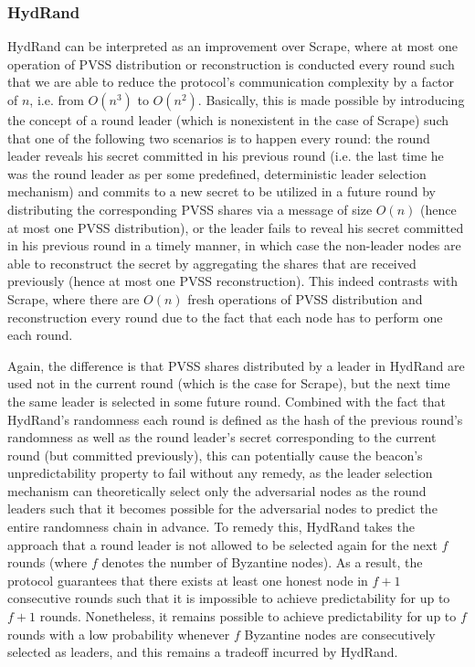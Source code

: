 \documentclass[11pt]{article}
\theoremstyle{definition}
\theoremstyle{remark}
\begin{document}
\subsubsection{HydRand}
HydRand can be interpreted as an improvement over Scrape, where at most one operation of PVSS distribution or reconstruction is conducted every round such that we are able to reduce the protocol's communication complexity by a factor of $n$, i.e. from $O(n^3)$ to $O(n^2)$. Basically, this is made possible by introducing the concept of a round leader (which is nonexistent in the case of Scrape) such that one of the following two scenarios is to happen every round: the round leader reveals his secret committed in his previous round (i.e. the last time he was the round leader as per some predefined, deterministic leader selection mechanism) and commits to a new secret to be utilized in a future round by distributing the corresponding PVSS shares via a message of size $O(n)$ (hence at most one PVSS distribution), or the leader fails to reveal his secret committed in his previous round in a timely manner, in which case the non-leader nodes are able to reconstruct the secret by aggregating the shares that are received previously (hence at most one PVSS reconstruction). This indeed contrasts with Scrape, where there are $O(n)$ fresh operations of PVSS distribution and reconstruction every round due to the fact that each node has to perform one each round.

Again, the difference is that PVSS shares distributed by a leader in HydRand are used not in the current round (which is the case for Scrape), but the next time the same leader is selected in some future round. Combined with the fact that HydRand's randomness each round is defined as the hash of the previous round's randomness as well as the round leader's secret corresponding to the current round (but committed previously), this can potentially cause the beacon's unpredictability property to fail without any remedy, as the leader selection mechanism can theoretically select only the adversarial nodes as the round leaders such that it becomes possible for the adversarial nodes to predict the entire randomness chain in advance. To remedy this, HydRand takes the approach that a round leader is not allowed to be selected again for the next $f$ rounds (where $f$ denotes the number of Byzantine nodes). As a result, the protocol guarantees that there exists at least one honest node in $f + 1$ consecutive rounds such that it is impossible to achieve predictability for up to $f + 1$ rounds. Nonetheless, it remains possible to achieve predictability for up to $f$ rounds with a low probability whenever $f$ Byzantine nodes are consecutively selected as leaders, and this remains a tradeoff incurred by HydRand.
\end{document}
